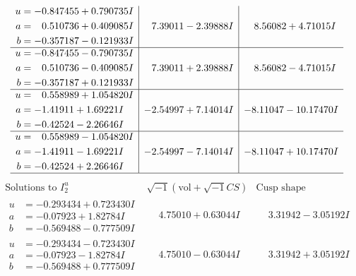 \documentclass[1p]{elsarticle_modified}
\theoremstyle{definition}
\newcommand{\I}{\sqrt{-1}}
\begin{document}
$$\begin{array}{c|c|c}
\begin{aligned}
u &= -0.847455 + 0.790735 I \\
a &= \phantom{-}0.510736 + 0.409085 I \\
b &= -0.357187 - 0.121933 I\end{aligned}
 & \phantom{-}7.39011 - 2.39888 I & \phantom{-}8.56082 + 4.71015 I \\ \hline\begin{aligned}
u &= -0.847455 - 0.790735 I \\
a &= \phantom{-}0.510736 - 0.409085 I \\
b &= -0.357187 + 0.121933 I\end{aligned}
 & \phantom{-}7.39011 + 2.39888 I & \phantom{-}8.56082 - 4.71015 I \\ \hline\begin{aligned}
u &= \phantom{-}0.558989 + 1.054820 I \\
a &= -1.41911 + 1.69221 I \\
b &= -0.42524 - 2.26646 I\end{aligned}
 & -2.54997 + 7.14014 I & -8.11047 - 10.17470 I \\ \hline\begin{aligned}
u &= \phantom{-}0.558989 - 1.054820 I \\
a &= -1.41911 - 1.69221 I \\
b &= -0.42524 + 2.26646 I\end{aligned}
 & -2.54997 - 7.14014 I & -8.11047 + 10.17470 I\\
 \hline 
 \end{array}$$\newpage$$\begin{array}{c|c|c}  
\text{Solutions to }I^u_{2}& \I (\text{vol} + \sqrt{-1}CS) & \text{Cusp shape}\\
 \hline 
\begin{aligned}
u &= -0.293434 + 0.723430 I \\
a &= -0.07923 + 1.82784 I \\
b &= -0.569488 - 0.777509 I\end{aligned}
 & \phantom{-}4.75010 + 0.63044 I & \phantom{-}3.31942 - 3.05192 I \\ \hline\begin{aligned}
u &= -0.293434 - 0.723430 I \\
a &= -0.07923 - 1.82784 I \\
b &= -0.569488 + 0.777509 I\end{aligned}
 & \phantom{-}4.75010 - 0.63044 I & \phantom{-}3.31942 + 3.05192 I \\ \hline\begin{aligned}

\end{aligned}
\end{array}$$
\end{document}
